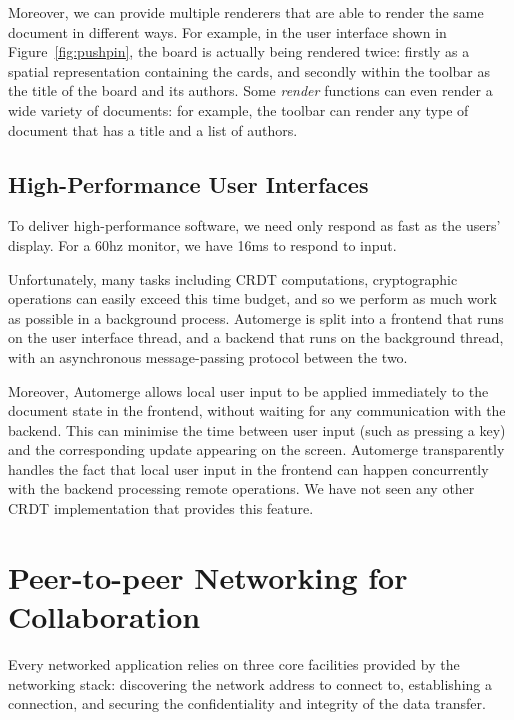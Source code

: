 \documentclass[sigplan,10pt]{acmart}
\begin{document}
Moreover, we can provide multiple renderers that are able to render the same document in different ways.
For example, in the user interface shown in Figure~\ref{fig:pushpin}, the board is actually being rendered twice: firstly as a spatial representation containing the cards, and secondly within the toolbar as the title of the board and its authors. Some \emph{render} functions can even render a wide variety of documents: for example, the toolbar can render any type of document that has a title and a list of authors.

\subsection{High-Performance User Interfaces}

To deliver high-performance software, we need only respond as fast as the users' display. For a 60hz monitor, we have 16ms to respond to input.

Unfortunately, many tasks including CRDT computations, cryptographic operations can easily exceed this time budget, and so we perform as much work as possible in a background process.
Automerge is split into a frontend that runs on the user interface thread, and a backend that runs on the background thread, with an asynchronous message-passing protocol between the two.

Moreover, Automerge allows local user input to be applied immediately to the document state in the frontend, without waiting for any communication with the backend. This can minimise the time between user input (such as pressing a key) and the corresponding update appearing on the screen.
Automerge transparently handles the fact that local user input in the frontend can happen concurrently with the backend processing remote operations.
We have not seen any other CRDT implementation that provides this feature.

\section{Peer-to-peer Networking for Collaboration}\label{sec:networking}

Every networked application relies on three core facilities provided by the networking stack: discovering the network address to connect to, establishing a connection, and securing the confidentiality and integrity of the data transfer.
\end{document}
